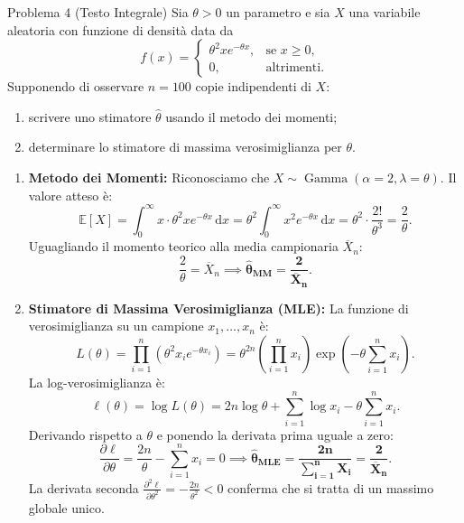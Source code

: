 \documentclass[11pt,a4paper]{article}
\newcommand{\EE}{\mathbb{E}}
\newcommand{\dx}{\mathrm{d}x}
\begin{document}
\begin{problemabox}{Problema 4 (Testo Integrale)}
Sia $\theta>0$ un parametro e sia $X$ una variabile aleatoria con funzione di densità data da
\[
f(x) = \begin{cases}
\theta^2 x e^{-\theta x}, & \text{se } x \ge 0, \\
0, & \text{altrimenti.}
\end{cases}
\]
Supponendo di osservare $n=100$ copie indipendenti di $X$:
\begin{enumerate}
    \item scrivere uno stimatore $\widehat{\theta}$ usando il metodo dei momenti;
    \item determinare lo stimatore di massima verosimiglianza per $\theta$.
\end{enumerate}
\end{problemabox}

\begin{soluzionebox}
\begin{enumerate}
    \item \textbf{Metodo dei Momenti:}
    Riconosciamo che $X \sim \operatorname{Gamma}(\alpha=2, \lambda=\theta)$. Il valore atteso è:
    \[
    \EE[X] = \int_0^\infty x \cdot \theta^2 x e^{-\theta x} \, \dx = \theta^2 \int_0^\infty x^2 e^{-\theta x} \, \dx = \theta^2 \cdot \frac{2!}{\theta^3} = \frac{2}{\theta}.
    \]
    Uguagliando il momento teorico alla media campionaria $\overline{X}_n$:
    \[
    \frac{2}{\theta} = \overline{X}_n \implies \mathbf{\widehat{\theta}_{\text{MM}} = \frac{2}{\overline{X}_n}}.
    \]

    \item \textbf{Stimatore di Massima Verosimiglianza (MLE):}
    La funzione di verosimiglianza su un campione $x_1, \dots, x_n$ è:
    \[
    L(\theta) = \prod_{i=1}^n \left( \theta^2 x_i e^{-\theta x_i} \right) = \theta^{2n} \left( \prod_{i=1}^n x_i \right) \exp\left( -\theta \sum_{i=1}^n x_i \right).
    \]
    La log-verosimiglianza è:
    \[
    \ell(\theta) = \log L(\theta) = 2n \log \theta + \sum_{i=1}^n \log x_i - \theta \sum_{i=1}^n x_i.
    \]
    Derivando rispetto a $\theta$ e ponendo la derivata prima uguale a zero:
    \[
    \frac{\partial \ell}{\partial \theta} = \frac{2n}{\theta} - \sum_{i=1}^n x_i = 0 \implies \mathbf{\widehat{\theta}_{\text{MLE}} = \frac{2n}{\sum_{i=1}^n X_i} = \frac{2}{\overline{X}_n}}.
    \]
    La derivata seconda $\frac{\partial^2 \ell}{\partial \theta^2} = -\frac{2n}{\theta^2} < 0$ conferma che si tratta di un massimo globale unico.
\end{enumerate}
\end{soluzionebox}
\end{document}
